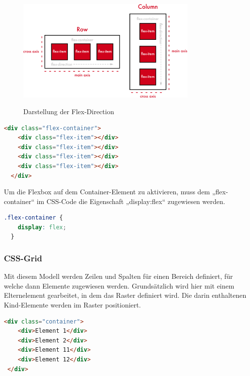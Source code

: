 \begin{figure}[H]
  \centering
  \includegraphics[width=0.8\textwidth]{pics/flexDirection.png}
  \caption{Darstellung der Flex-Direction}
  \cite{flexbox2}
\end{figure}


\begin{lstlisting}[language=HTML, caption=HTML-Code vom Aufbau einer Flexbox , label=lst:impl:flexHTML]
  <div class="flex-container">
    <div class="flex-item"></div>
    <div class="flex-item"></div>
    <div class="flex-item"></div>
    <div class="flex-item"></div>
  </div>
\end{lstlisting} \cite{flexbox}

Um die Flexbox auf dem Container-Element zu aktivieren, muss dem „flex-container“ im CSS-Code die Eigenschaft „display:flex“ zugewiesen werden. 
\cite{flexbox}

\begin{lstlisting}[language=CSS, caption=CSS-Code zur Aktivierung der Flexbox, label=lst:impl:flexCSS]
  .flex-container {
    display: flex;
  }
\end{lstlisting} \cite{flexbox}

\subsubsection{CSS-Grid}

Mit diesem Modell werden Zeilen und Spalten für einen Bereich definiert, für welche dann Elemente zugewiesen werden. Grundsätzlich wird hier mit einem Elternelement gearbeitet, in dem das Raster definiert wird. Die darin enthaltenen Kind-Elemente werden im Raster positioniert. 
\cite{cssgrid}


\begin{lstlisting}[language=HTML, caption=HTML-Code vom Aufbau eines Grids, label=lst:impl:gridHTML]
  <div class="container"> 
    <div>Element 1</div> 
    <div>Element 2</div> 
    <div>Element 11</div> 
    <div>Element 12</div> 
 </div>
\end{lstlisting} \cite{cssgrid}

